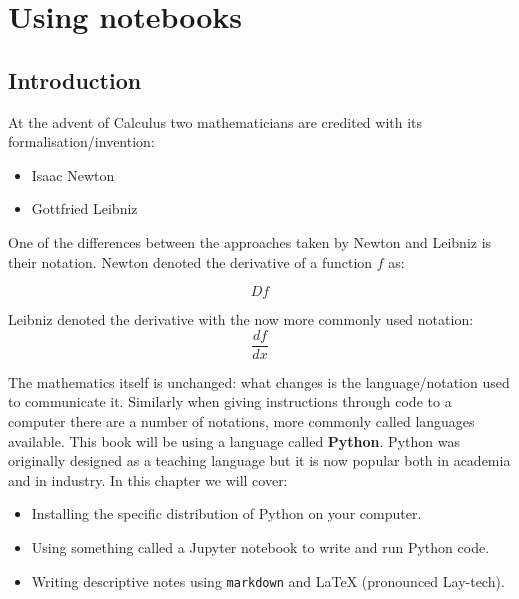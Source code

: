 \chapter{Using notebooks}
\label{\detokenize{tools-for-mathematics/01-using-notebooks/introduction/main:using-notebooks}}\label{\detokenize{tools-for-mathematics/01-using-notebooks/introduction/main:id1}}\label{\detokenize{tools-for-mathematics/01-using-notebooks/introduction/main::doc}}

\section{Introduction}
At the advent of Calculus two mathematicians are credited with its
formalisation/invention:

\begin{itemize}
    \item Isaac Newton
    \item Gottfried Leibniz
\end{itemize}

One of the differences between the approaches taken by Newton and Leibniz is
their notation. Newton denoted the derivative of a function \(f\) as:

\begin{equation*}
Df
\end{equation*}

Leibniz denoted the derivative with the now more commonly used notation:
\begin{equation*}
\frac{df}{dx}
\end{equation*}

The mathematics itself is unchanged: what changes is the language/notation used
to communicate it. Similarly when giving instructions through code to a computer there are a number
of notations, more commonly called languages available.
This book will be using a language called \textbf{Python}.
Python was originally designed as a teaching language but it is now popular both
in academia and in industry.
In this chapter we will cover:
\begin{itemize}
\item 
Installing the specific distribution of Python on your computer.

\item 
Using something called a Jupyter notebook to write and run Python code.

\item Writing descriptive notes using \texttt{markdown} and \LaTeX\; (pronounced
    Lay-tech).

\end{itemize}

